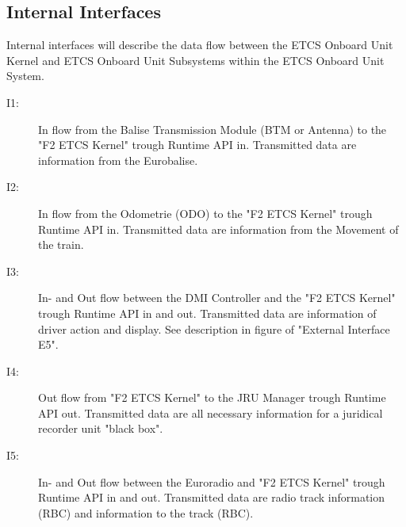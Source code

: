 \subsection{Internal Interfaces}
Internal interfaces will describe the data flow between the ETCS Onboard Unit Kernel and ETCS Onboard Unit Subsystems within the ETCS Onboard Unit System.

\begin{description}
\item[I1:] In flow from the Balise Transmission Module (BTM or Antenna) to the "F2 ETCS Kernel" trough Runtime API in. Transmitted data are information from the Eurobalise.

\item[I2:] In flow from the Odometrie (ODO) to the "F2 ETCS Kernel" trough Runtime API in. Transmitted data are information from the Movement of the train.

\item[I3:] In- and Out flow between the DMI Controller and the "F2 ETCS Kernel" trough Runtime API in and out. Transmitted data are information of driver action and display. See description in figure of "External Interface E5".

\item[I4:] Out flow from "F2 ETCS Kernel" to the JRU Manager trough Runtime API out. Transmitted data are all necessary information for a juridical recorder unit "black box".

\item[I5:] In- and Out flow between the Euroradio and "F2 ETCS Kernel" trough Runtime API in and out. Transmitted data are radio track information (RBC) and information to the track (RBC). 
\end{description}

